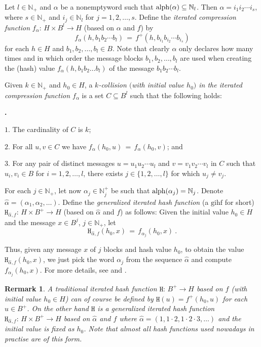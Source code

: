 \documentclass[submission,copyright,creativecommons]{eptcs}
\newcommand{\N}{\mathbb N}
\newcommand{\alp}{{\rm alph}}
\newcommand{\h}{\mathtt H}
\newcounter{dep}
\newenvironment{luet}
{
\setlength{\parskip}{5pt}
\begin{list}
{{\bf \arabic{dep}.}}{\usecounter{dep}\setlength{\topsep}{1pt}\setlength{\rightmargin}{\leftmargin}\setlength{\parsep}{3pt}\setlength{\itemsep}{2pt}}
}
{\end{list}}
\newtheorem{remark}{Rermark}
\begin{document}
Let $l\in\N_+$ and $\alpha$ be a nonemptyword such that $\alp(\alpha)\subseteq\N_l$. Then $\alpha=i_1i_2\cdots i_s$, where $s\in\N_+$ and $i_j\in\N_l$ for $j=1,2,\ldots,s$. Define the \emph{iterated compression function} $f_\alpha:\,H\times B^l\rightarrow H$ (based on $\alpha$
and $f$) by 
\[
f_\alpha(h,b_1b_2\cdots b_l)\,=\,f^+(h,b_{i_1}b_{i_2}\cdots b_{i_s})
\]
for each $h\in H$ and $b_1,b_2,\ldots,b_l\in B$. Note that clearly $\alpha$ only declares how many times and in which order the message blocks $b_1,b_2,\ldots,b_l$ are used when creating the (hash) value $f_{\alpha}(h,b_1b_2\ldots b_l)$ of the message $b_1b_2\cdots b_l$. 

Given $k\in\N_+$ and $h_0\in H$, a \textit{$k$-collision $($with  initial value $h_0$$)$ in the iterated compression function $f_\alpha$} is a set $C\subseteq B^l$ such that the following holds:
\begin{luet}
\item[$1.$] The cardinality of $C$ is $k$; 
\item[$2.$] For  all $u,v\in C$ we have $f_\alpha(h_0,u)\,=\,f_\alpha(h_0,v)$; and
\item[$3.$] For any pair of distinct messages $u=u_1u_2\cdots u_l$ and $v=v_1v_2\cdots v_l$ in $C$ such that $u_i,v_i\in B$ for $i=1,2,\ldots,l$, there  exists $j\in\{1,2,\ldots,l\}$ for which $u_j\neq v_j$.
\end{luet}

For each $j\in\N_+$, let now $\alpha_j\in\N_j^+$ be such that
$\alp(\alpha_j)=\N_j$. Denote $\hat{\alpha}=(\alpha_1,\alpha_2,
\ldots)$. Define the \emph{generalized iterated hash function} (a $\mathrm{gihf}$ for short)
$\h_{\hat{\alpha},f}:\, H\times B^+\rightarrow
H$ (based on $\hat{\alpha}$ and $f$) as follows: Given the
initial value $h_0\in H$ and the message $x\in B^j$, $j\in\N_+$, let
\[
\h_{\hat{\alpha},f}(h_0,x)\,=\,f_{\alpha_j}(h_0,x)\ .
\]

Thus,  given any message $x$ of $j$ blocks and hash value $h_0$, to obtain the value $\h_{\hat{\alpha},f}(h_0,x)$, we just pick the word $\alpha_j$ from the sequence $\hat{\alpha}$ and compute $f_{\alpha_j}(h_0,x)$. For more details, see \cite{KHK} and \cite{HoS}.

\begin{remark}\label{Tra}
A traditional iterated hash function $\h:\, B^+\rightarrow
H$ based on $f$ (with initial value $h_0\in H$) can of
course be defined by $\h(u)=f^+(h_0,u)$ for each
$u\in B^+$. On the other hand $\h$ is a generalized iterated
hash function $\h_{\hat{\alpha},f}:\, H\times
B^+\rightarrow H$ based on $\hat{\alpha}$ and $f$
where $\hat{\alpha}=(1,1\cdot 2,1\cdot2\cdot3,\ldots)$ and the initial
value is fixed as $h_0$. Note that almost all hash functions used nowadays in practise are of this form.  
\end{remark}
\end{document}
